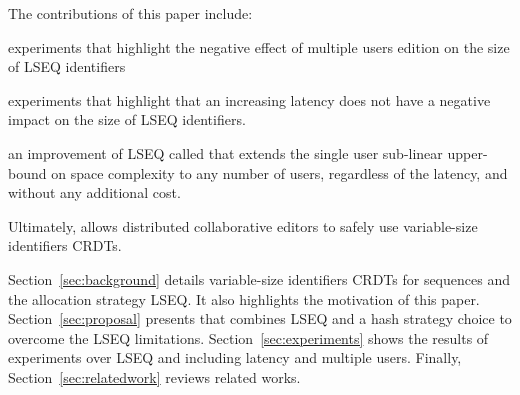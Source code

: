 The contributions of this paper include:
\begin{inparaenum}[(i)]
\item experiments that highlight the negative effect of multiple users edition
  on the size of LSEQ identifiers
\item experiments that highlight that an increasing latency does not have a
  negative impact on the size of LSEQ identifiers.
\item an improvement of LSEQ called \NAME{} that extends the single user
  sub-linear upper-bound on space complexity to any number of users, regardless
  of the latency, and without any additional cost.
\end{inparaenum} 

Ultimately, \NAME{} allows distributed collaborative editors to safely use
variable-size identifiers CRDTs.

Section~\ref{sec:background} details variable-size identifiers CRDTs for
sequences and the allocation strategy LSEQ. It also highlights the motivation
of this paper.  Section~\ref{sec:proposal} presents \NAME{} that combines LSEQ
and a hash strategy choice to overcome the LSEQ limitations.
Section~\ref{sec:experiments} shows the results of experiments over LSEQ and
\NAME{} including latency and multiple users. Finally,
Section~\ref{sec:relatedwork} reviews related works.


